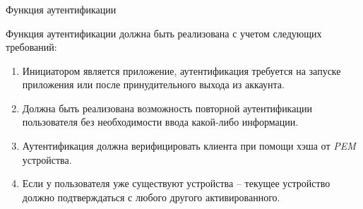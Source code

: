 \subsubsection{} Функция аутентификации
\label{sec:analysis:research:funcreq:auth}

Функция аутентификации должна быть реализована с учетом следующих требований:

\begin{enumerate}
	\item Инициатором является приложение, аутентификация требуется на запуске приложения или после принудительного выхода из аккаунта.
	\item Должна быть реализована возможность повторной аутентификации пользователя без необходимости ввода какой-либо информации.
	\item Аутентификация должна верифицировать клиента при помощи хэша от \textit{PEM} устройства.
	\item Если у пользователя уже существуют устройства -- текущее устройство должно подтверждаться с любого другого активированного.
\end{enumerate}